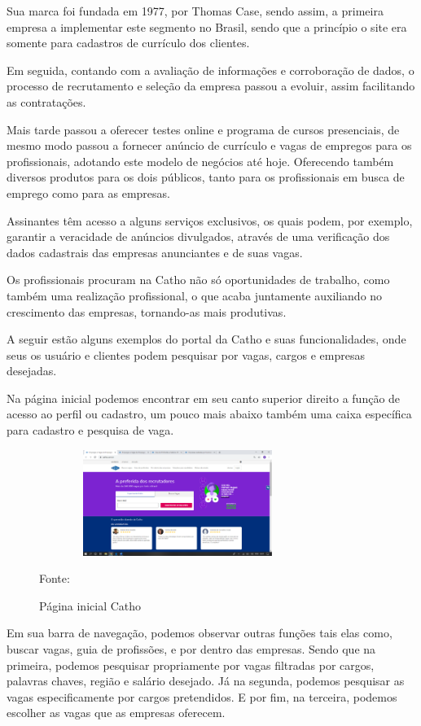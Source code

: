 Sua marca foi fundada em 1977, por Thomas Case, sendo assim, a primeira empresa a implementar este segmento no Brasil, sendo que a princípio o site era somente para cadastros de currículo dos clientes.

Em seguida, contando com a avaliação de informações e corroboração de dados, o processo de recrutamento e seleção da empresa passou a evoluir, assim facilitando as contratações.

Mais tarde passou a oferecer testes online e programa de cursos presenciais, de mesmo modo passou a fornecer anúncio de currículo e vagas de empregos para os profissionais, adotando este modelo de negócios até hoje. Oferecendo também diversos produtos para os dois públicos, tanto para os profissionais em busca de emprego como para as empresas.

Assinantes têm acesso a alguns serviços exclusivos, os quais podem, por exemplo, garantir a veracidade de anúncios divulgados, através de uma verificação dos dados cadastrais das empresas anunciantes e de suas vagas.

Os profissionais procuram na Catho não só oportunidades de trabalho, como também uma realização profissional, o que acaba juntamente auxiliando no crescimento das empresas, tornando-as mais produtivas.

A seguir estão alguns exemplos do portal da Catho e suas funcionalidades, onde seus os usuário e clientes podem pesquisar por vagas, cargos e empresas desejadas.

Na página inicial podemos encontrar em seu canto superior direito a função de acesso ao perfil ou cadastro, um pouco mais abaixo também uma caixa específica para cadastro e pesquisa de vaga.

\begin{figure}[!h]
	\centering
	\caption{Página inicial Catho }
	\includegraphics[width=340px, height=130px]{./images/cattho.png}
	\par {Fonte: \cite{catho}}
\end{figure}
\newpage
Em sua barra de navegação, podemos observar outras funções tais elas como, buscar vagas, guia de profissões, e por dentro das empresas. Sendo que na primeira, podemos pesquisar propriamente por vagas filtradas por cargos, palavras chaves, região e salário desejado. Já na segunda, podemos pesquisar as vagas especificamente por cargos pretendidos. E por fim, na terceira, podemos escolher as vagas que as empresas oferecem.

